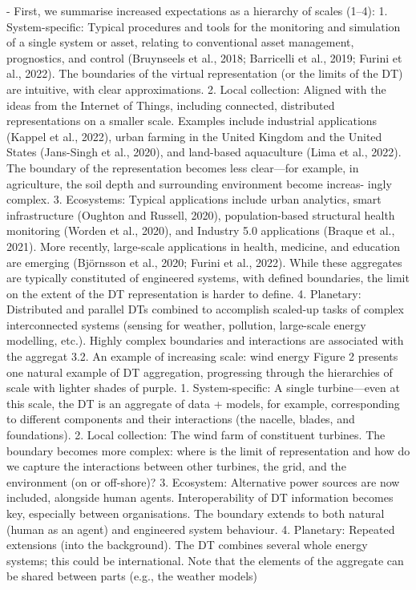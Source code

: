 \cite{pias2025scaling} -  First, we summarise increased expectations as a hierarchy of scales (1–4):
1. System-specific: Typical procedures and tools for the monitoring and simulation of a single system
or asset, relating to conventional asset management, prognostics, and control (Bruynseels et al.,
2018; Barricelli et al., 2019; Furini et al., 2022). The boundaries of the virtual representation (or the
limits of the DT) are intuitive, with clear approximations.
2. Local collection: Aligned with the ideas from the Internet of Things, including connected,
distributed representations on a smaller scale. Examples include industrial applications (Kappel
et al., 2022), urban farming in the United Kingdom and the United States (Jans-Singh et al., 2020),
and land-based aquaculture (Lima et al., 2022). The boundary of the representation becomes less
clear—for example, in agriculture, the soil depth and surrounding environment become increas-
ingly complex.
3. Ecosystems: Typical applications include urban analytics, smart infrastructure (Oughton and
Russell, 2020), population-based structural health monitoring (Worden et al., 2020), and Industry
5.0 applications (Braque et al., 2021). More recently, large-scale applications in health, medicine,
and education are emerging (Björnsson et al., 2020; Furini et al., 2022). While these aggregates are
typically constituted of engineered systems, with defined boundaries, the limit on the extent of the
DT representation is harder to define.
4. Planetary: Distributed and parallel DTs combined to accomplish scaled-up tasks of complex
interconnected systems (sensing for weather, pollution, large-scale energy modelling, etc.). Highly
complex boundaries and interactions are associated with the aggregat
3.2. An example of increasing scale: wind energy
Figure 2 presents one natural example of DT aggregation, progressing through the hierarchies of scale
with lighter shades of purple.
1. System-specific: A single turbine—even at this scale, the DT is an aggregate of data + models, for
example, corresponding to different components and their interactions (the nacelle, blades, and
foundations).
2. Local collection: The wind farm of constituent turbines. The boundary becomes more complex:
where is the limit of representation and how do we capture the interactions between other turbines,
the grid, and the environment (on or off-shore)?
3. Ecosystem: Alternative power sources are now included, alongside human agents. Interoperability
of DT information becomes key, especially between organisations. The boundary extends to both
natural (human as an agent) and engineered system behaviour.
4. Planetary: Repeated extensions (into the background). The DT combines several whole energy
systems; this could be international. Note that the elements of the aggregate can be shared between
parts (e.g., the weather models)



